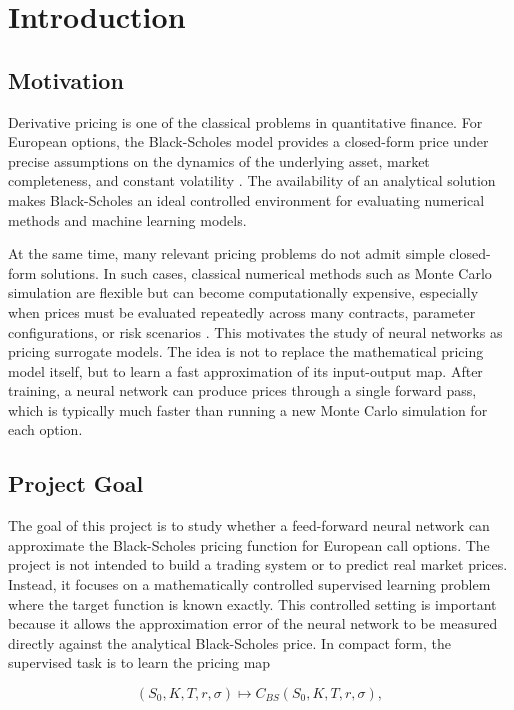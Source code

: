 \chapter{Introduction}

\section{Motivation}

Derivative pricing is one of the classical problems in quantitative finance.
For European options, the Black-Scholes model provides a closed-form price under precise assumptions on the dynamics of the underlying asset, market completeness, and constant volatility \cite{black1973pricing}.
The availability of an analytical solution makes Black-Scholes an ideal controlled environment for evaluating numerical methods and machine learning models.

At the same time, many relevant pricing problems do not admit simple closed-form solutions.
In such cases, classical numerical methods such as Monte Carlo simulation are flexible but can become computationally expensive, especially when prices must be evaluated repeatedly across many contracts, parameter configurations, or risk scenarios \cite{glasserman2004monte}.
This motivates the study of neural networks as pricing surrogate models.
The idea is not to replace the mathematical pricing model itself, but to learn a fast approximation of its input-output map.
After training, a neural network can produce prices through a single forward pass, which is typically much faster than running a new Monte Carlo simulation for each option.

\section{Project Goal}

The goal of this project is to study whether a feed-forward neural network can approximate the Black-Scholes pricing function for European call options.
The project is not intended to build a trading system or to predict real market prices.
Instead, it focuses on a mathematically controlled supervised learning problem where the target function is known exactly.
This controlled setting is important because it allows the approximation error of the neural network to be measured directly against the analytical Black-Scholes price.
In compact form, the supervised task is to learn the pricing map

\begin{equation}
    (S_0, K, T, r, \sigma) \longmapsto C_{BS}(S_0, K, T, r, \sigma),
\end{equation}

